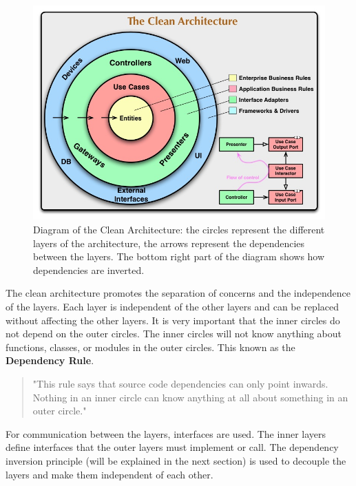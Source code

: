 \begin{spacing}{1.2}
    \begin{figure}
        \centering
        \includegraphics[scale=0.5]{Chapitre2/figures/CleanArchitecture.jpg}
        \caption{Diagram of the Clean Architecture: the circles represent the different
            layers of the architecture, the arrows represent the dependencies between the layers.
            The bottom right part of the diagram shows how dependencies are inverted.}
        \label{fig:clean}
    \end{figure}

    The clean architecture promotes the separation of concerns and the independence of the layers. Each layer is independent of the other layers and can be replaced without affecting the other layers.
    It is very important that the inner circles do not depend on the outer circles. The inner circles
    will not know anything about functions, classes, or modules in the outer circles. This known as
    the \textbf{Dependency Rule}.
    \begin{quote}
        "This rule says that source code dependencies can only point inwards. Nothing in an inner circle can know anything at all about something in an outer
        circle." \cite{cleanBlog}

    \end{quote}

    For communication between the layers, interfaces are used. The inner layers define interfaces that
    the outer layers must implement or call. The dependency inversion principle (will be explained in the next section) is used
    to decouple the layers and make them independent of each other.



\end{spacing}
